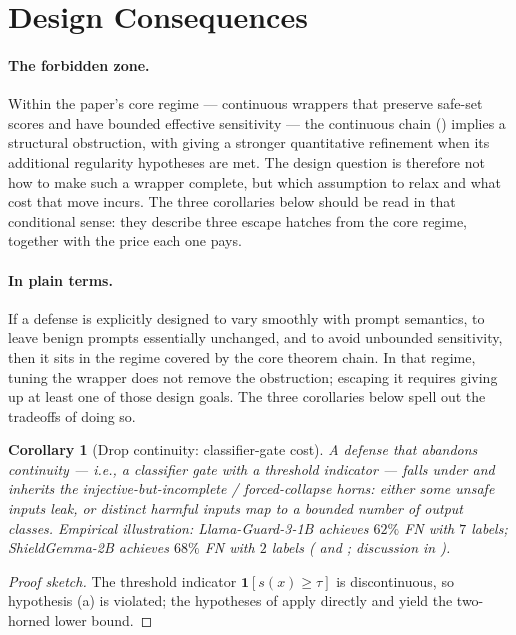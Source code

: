 \documentclass[11pt]{article}
\newtheorem{corollary}[theorem]{Corollary}
\begin{document}
\section{Design Consequences}
\label{sec:design-consequences}

\paragraph{The forbidden zone.}
Within the paper's core regime --- continuous wrappers that preserve
safe-set scores and have bounded effective sensitivity --- the
continuous chain
()
implies a structural obstruction, with  giving a
stronger quantitative refinement when its additional regularity
hypotheses are met. The design question is therefore not how to make
such a wrapper complete, but which assumption to relax and what cost
that move incurs. The three corollaries below should be read in that
conditional sense: they describe three escape hatches from the core
regime, together with the price each one pays.

\paragraph{In plain terms.}
If a defense is explicitly designed to vary smoothly with prompt
semantics, to leave benign prompts essentially unchanged, and to avoid
unbounded sensitivity, then it sits in the regime covered by the core
theorem chain. In that regime, tuning the wrapper does not remove the
obstruction; escaping it requires giving up at least one of those
design goals. The three corollaries below spell out the tradeoffs of
doing so.

\begin{corollary}[Drop continuity: classifier-gate cost]
\label{cor:drop-continuity}
A defense that abandons continuity --- i.e., a classifier gate with a
threshold indicator --- falls under  and
inherits the injective-but-incomplete / forced-collapse horns: either
some unsafe inputs leak, or distinct harmful inputs map to a bounded
number of output classes.
Empirical illustration: Llama-Guard-3-1B achieves $62\%$ FN with $7$
labels; ShieldGemma-2B achieves $68\%$ FN with $2$ labels
( and ;
discussion in ).
\end{corollary}
\begin{proof}[Proof sketch]
The threshold indicator $\mathbf{1}[s(x) \geq \tau]$ is discontinuous,
so hypothesis (a) is violated; the hypotheses of
 apply directly and yield the two-horned lower
bound.
\end{proof}
\end{document}
